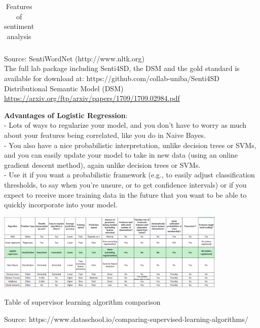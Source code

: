 \documentclass{beamer}
\begin{document}
\begin{frame}
{\begin{table}[]
\begin{tabular}{|l|l|lll}
			
		\end{tabular}
		\caption{Features of sentiment analysis}
		\label{tab:3}
\end{table}}
{\tiny Source: SentiWordNet (http://www.nltk.org)} \\
{\tiny The full lab package including Senti4SD, the DSM and the gold standard is available for download at: https://github.com/collab-uniba/Senti4SD} \\
{\tiny Distributional Semantic Model (DSM) \url{https://arxiv.org/ftp/arxiv/papers/1709/1709.02984.pdf}}
\end{frame}
\begin{frame}
\textbf{Advantages of Logistic Regression}: \\
- Lots of ways to regularize your model, and you don’t have to worry as much about your features being correlated, like you do in Naive Bayes. \\
- You also have a nice probabilistic interpretation, unlike decision trees or SVMs, and you can easily update your model to take in new data (using an online gradient descent method), again unlike decision trees or SVMs. \\
- Use it if you want a probabilistic framework (e.g., to easily adjust classification thresholds, to say when you’re unsure, or to get confidence intervals) or if you expect to receive more training data in the future that you want to be able to quickly incorporate into your model.
\end{frame}
\begin{frame}
\includegraphics[width=110mm]{compare.png} \\
\begin{center}
	Table of supervisor learning algorithm comparison
\end{center}


{\tiny Source: https://www.dataschool.io/comparing-supervised-learning-algorithms/}
\end{frame}
\end{document}
